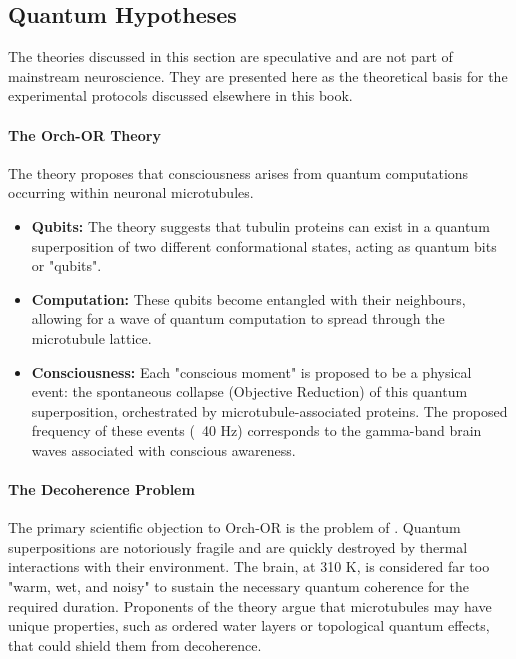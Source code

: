 \subsection{Quantum Hypotheses}

\begin{warningbox}
    The theories discussed in this section are speculative and are not part of mainstream neuroscience. They are presented here as the theoretical basis for the experimental protocols discussed elsewhere in this book.
\end{warningbox}

\paragraph{The Orch-OR Theory}
The  theory proposes that consciousness arises from quantum computations occurring within neuronal microtubules.
\begin{itemize}
    \item \textbf{Qubits:} The theory suggests that tubulin proteins can exist in a quantum superposition of two different conformational states, acting as quantum bits or "qubits".
    \item \textbf{Computation:} These qubits become entangled with their neighbours, allowing for a wave of quantum computation to spread through the microtubule lattice.
    \item \textbf{Consciousness:} Each "conscious moment" is proposed to be a physical event: the spontaneous collapse (Objective Reduction) of this quantum superposition, orchestrated by microtubule-associated proteins. The proposed frequency of these events (~40 Hz) corresponds to the gamma-band brain waves associated with conscious awareness.
\end{itemize}

\paragraph{The Decoherence Problem}
The primary scientific objection to Orch-OR is the problem of . Quantum superpositions are notoriously fragile and are quickly destroyed by thermal interactions with their environment. The brain, at 310 K, is considered far too "warm, wet, and noisy" to sustain the necessary quantum coherence for the required duration. Proponents of the theory argue that microtubules may have unique properties, such as ordered water layers or topological quantum effects, that could shield them from decoherence.


